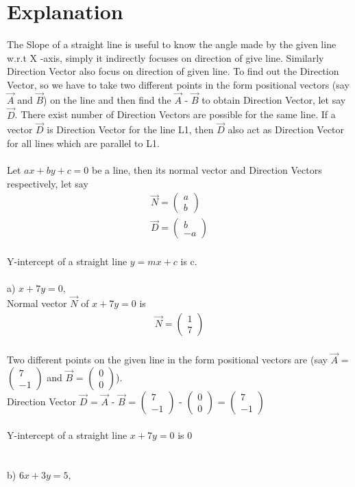 \documentclass[journal,12pt,twocolumn]{IEEEtran}
\newcommand{\myvec}[1]{\ensuremath{\begin{pmatrix}#1\end{pmatrix}}}
\begin{document}
\section{Explanation}
The Slope of a straight line is useful to know the angle made by the given line w.r.t X -axis, simply it indirectly focuses on direction of give line. Similarly Direction Vector also focus on direction of given line. To find out the Direction Vector, so we have to take two different points in the form positional vectors (say $\vec{A}$ and $\vec{B}$) on the line and then find the $\vec{A}$ - $\vec{B}$ to obtain Direction Vector, let say $\vec{D}$. There exist number of Direction Vectors are possible for the same line. If a vector $\vec{D}$ is Direction Vector for the line L1, then $\vec{D}$ also act as Direction Vector for all lines which are parallel to L1.
\\
\\
Let $ ax+by+c=0 $ be a line, then its normal vector and Direction Vectors respectively, let say  \begin{align}
	\vec{N} = \myvec{ a \\ b }\\
	\vec{D} = \myvec{ b \\ -a }
\end{align}
\\
Y-intercept of a straight line $ y = mx + c $ is c.
\\
\\
a) $ x  + 7y =  0,$
\\
Normal vector $\vec{N}$ of $ x  + 7y = 0 $ is   \begin{align}
	\vec{N} = \myvec{ 1 \\ 7 }
\end{align}
\\
	Two different points on the given line in the form positional vectors are (say $\vec{A}$ = \myvec{ 7 \\ -1 } and $\vec{B}$ = \myvec{ 0 \\ 0 }).\\
Direction Vector $\vec{D}$ = $\vec{A}$ - $\vec{B}$ = \myvec{ 7 \\ -1 } - \myvec{ 0 \\ 0 } = \myvec{ 7 \\ -1 }
\\
\\
Y-intercept of a straight line $ x  + 7y =  0 $ is 0
\\
\\
\\
b) $ 6x  + 3y =  5,$
\end{document}
